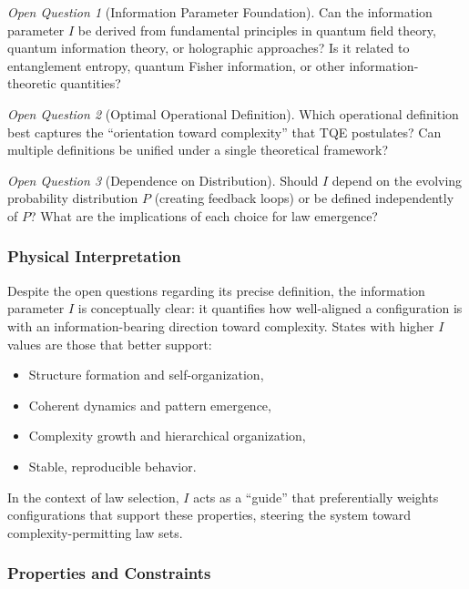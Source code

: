 \documentclass[12pt,a4paper]{article}
\theoremstyle{definition}
\theoremstyle{remark}
\newtheorem{question}{Open Question}[section]
\begin{document}
\begin{question}[Information Parameter Foundation]
Can the information parameter $I$ be derived from fundamental principles in quantum field theory, quantum information theory, or holographic approaches? Is it related to entanglement entropy, quantum Fisher information, or other information-theoretic quantities?
\end{question}

\begin{question}[Optimal Operational Definition]
Which operational definition best captures the ``orientation toward complexity'' that TQE postulates? Can multiple definitions be unified under a single theoretical framework?
\end{question}

\begin{question}[Dependence on Distribution]
Should $I$ depend on the evolving probability distribution $P$ (creating feedback loops) or be defined independently of $P$? What are the implications of each choice for law emergence?
\end{question}

\subsubsection{Physical Interpretation}

Despite the open questions regarding its precise definition, the information parameter $I$ is conceptually clear: it quantifies how well-aligned a configuration is with an information-bearing direction toward complexity. States with higher $I$ values are those that better support:
\begin{itemize}
\item Structure formation and self-organization,
\item Coherent dynamics and pattern emergence,
\item Complexity growth and hierarchical organization,
\item Stable, reproducible behavior.
\end{itemize}

In the context of law selection, $I$ acts as a ``guide'' that preferentially weights configurations that support these properties, steering the system toward complexity-permitting law sets.

\subsubsection{Properties and Constraints}
\end{document}
